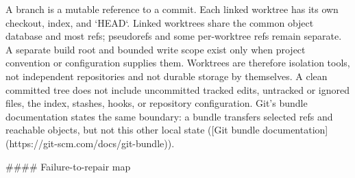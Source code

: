 \documentclass[11pt]{article}
\begin{document}
\begin{markdown}
A branch is a mutable reference to a commit. Each linked worktree has its own checkout, index, and
`HEAD`. Linked worktrees share the common object database and most refs; pseudorefs and some
per-worktree refs remain separate. A separate build root and bounded write
scope exist only when project convention or configuration supplies them. Worktrees are therefore
isolation tools, not independent repositories and not durable storage by themselves. A clean
committed tree does not include uncommitted tracked edits, untracked or ignored files, the index,
stashes, hooks, or repository configuration. Git's bundle documentation states the same boundary:
a bundle transfers selected refs and reachable objects, but not this other local state
([Git bundle documentation](https://git-scm.com/docs/git-bundle)).

#### Failure-to-repair map


\end{markdown}
\end{document}
